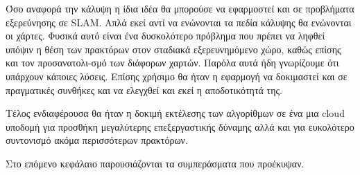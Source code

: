 Όσο αναφορά την κάλυψη η ίδια ιδέα θα μπορούσε να εφαρμοστεί και σε προβλήματα εξερεύνησης σε SLAM. Απλά εκεί αντί να ενώνονται τα πεδία κάλυψης θα ενώνονται οι χάρτες. Φυσικά αυτό είναι ένα δυσκολότερο πρόβλημα που πρέπει να ληφθεί υπόψιν η θέση των πρακτόρων στον σταδιακά εξερευνημόμενο χώρο, καθώς επίσης και τον προσανατολι-σμό των διάφορων χαρτών. Παρόλα αυτά ήδη γνωρίζουμε ότι υπάρχουν κάποιες λύσεις. Επίσης χρήσιμο θα ήταν η εφαρμογή να δοκιμαστεί και σε πραγματικές συνθήκες και να ελεγχθεί και εκεί η αποδοτικότητά της.

Τέλος ενδιαφέρουσα θα ήταν η δοκιμή εκτέλεσης των αλγορίθμων σε ένα μια cloud υποδομή για προσθήκη μεγαλύτερης  επεξεργαστικής δύναμης αλλά και για ευκολότερο συντονισμό ακόμα περισσότερων πρακτόρων.

Στο επόμενο κεφάλαιο παρουσιάζονται τα συμπεράσματα που προέκυψαν.

 